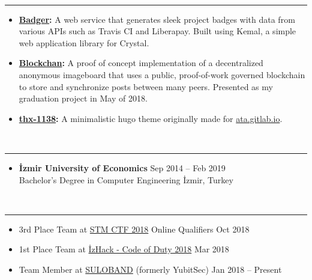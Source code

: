 \documentclass[a4paper, 11pt]{article}
\newcommand{\resumeSection}[1]{\vspace{12pt}{\Large \bfseries #1} \vspace{-9pt} \\ \rule{\textwidth}{0.7pt}}
\newcommand{\resumeSubsection}[1]{\textbf{#1}}
\begin{document}
	\resumeSection{Projects}
	
	\begin{itemize}
		\item \resumeSubsection{\href{https://github.com/LVMBDV/badger}{Badger}:} A web service that generates sleek project badges with data from various APIs such as Travis CI and Liberapay. Built using Kemal, a simple web application library for Crystal.
		\item \resumeSubsection{\href{https://github.com/LVMBDV/blockchan}{Blockchan}:} A proof of concept implementation of a decentralized anonymous imageboard that uses a public, proof-of-work governed blockchain to store and synchronize posts between many peers. Presented as my graduation project in May of 2018.
		\item \resumeSubsection{\href{https://gitlab.com/Ata/thx-1138}{thx-1138}:} A minimalistic hugo theme originally made for \href{https://ata.gitlab.io}{ata.gitlab.io}.
	\end{itemize}
	
	\resumeSection{Education}
	
	\begin{itemize}
		\item \resumeSubsection{İzmir University of Economics} \hfill Sep 2014 – Feb 2019 \\
		Bachelor’s Degree in Computer Engineering \hfill İzmir, Turkey
	\end{itemize}
	
	\resumeSection{Extracurricular Activities}
	
	\begin{itemize}
		\item 3rd Place Team at \href{https://ctf.stm.com.tr}{STM CTF 2018} Online Qualifiers \hfill Oct 2018
		\item 1st Place Team at \href{http://codeofduty.iyte.edu.tr}{İzHack - Code of Duty 2018} \hfill Mar 2018
		\item Team Member at \href{https://twitter.com/Suloband}{SULOBAND} (formerly YubitSec) \hfill Jan 2018 – Present
	\end{itemize}
\end{document}
